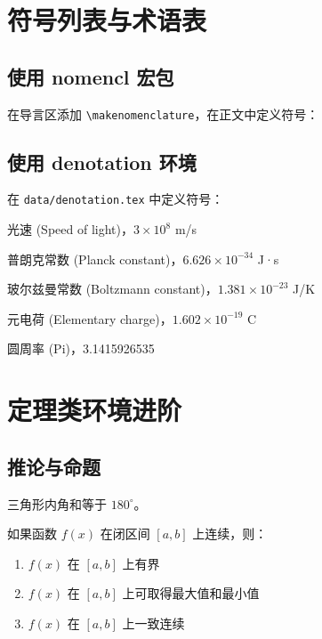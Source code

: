 \section{符号列表与术语表}
\label{sec:symbols}

\subsection{使用 nomencl 宏包}
在导言区添加 \verb|\makenomenclature|，在正文中定义符号：


\subsection{使用 denotation 环境}
在 \texttt{data/denotation.tex} 中定义符号：

\begin{denotation}[3.5cm]
  \item[$c$] 光速 (Speed of light)，$3\times10^8$ m/s
  \item[$h$] 普朗克常数 (Planck constant)，$6.626\times10^{-34}$ J·s
  \item[$k_B$] 玻尔兹曼常数 (Boltzmann constant)，$1.381\times10^{-23}$ J/K
  \item[$e$] 元电荷 (Elementary charge)，$1.602\times10^{-19}$ C
  \item[$\pi$] 圆周率 (Pi)，3.1415926535
\end{denotation}

\section{定理类环境进阶}
\label{sec:theorems_adv}

\subsection{推论与命题}
\begin{corollary}[三角形内角和]
\label{cor:triangle_sum}
三角形内角和等于 $180^\circ$。
\end{corollary}

\begin{proposition}[连续函数性质]
\label{prop:continuous}
如果函数 $f(x)$ 在闭区间 $[a,b]$ 上连续，则：
\begin{enumerate}
  \item $f(x)$ 在 $[a,b]$ 上有界
  \item $f(x)$ 在 $[a,b]$ 上可取得最大值和最小值
  \item $f(x)$ 在 $[a,b]$ 上一致连续
\end{enumerate}
\end{proposition}

